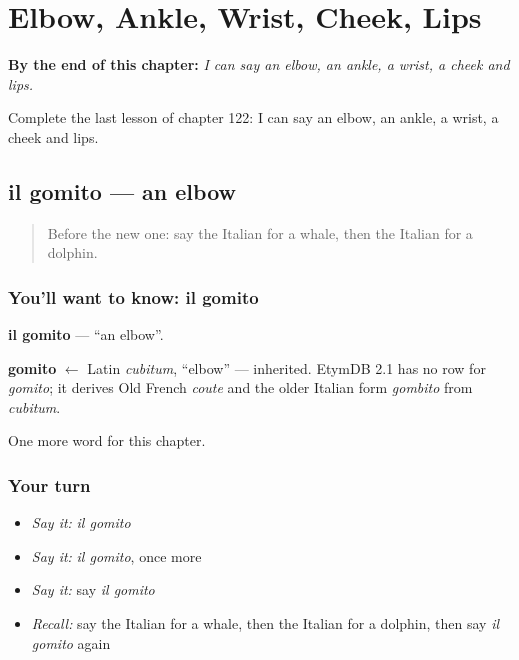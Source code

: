 
\chapter{Elbow, Ankle, Wrist, Cheek, Lips}
\label{ch:it-elbow-ankle-wrist-cheek-lips}

\begin{chapteropening}
\textbf{By the end of this chapter:} \emph{I can say an elbow, an ankle, a wrist, a cheek and lips.}

Complete the last lesson of chapter 122: I can say an elbow, an ankle, a wrist, a cheek and lips.
\end{chapteropening}

\section[il gomito]{il gomito — an elbow}

\label{lesson:IT-C122-gomito}



\begin{quote}
Before the new one: say the Italian for a whale, then the Italian for a dolphin.
\end{quote}

\subsection*{You'll want to know: il gomito}
\textbf{il gomito} — \textquotedblleft{}an elbow\textquotedblright{}.

\begin{cousinweb}
\textbf{gomito} $\leftarrow$ Latin \emph{cubitum}, \textquotedblleft{}elbow\textquotedblright{} — inherited. EtymDB 2.1 has no row for \emph{gomito}; it derives Old French \emph{coute} and the older Italian form \emph{gombito} from \emph{cubitum}.
\end{cousinweb}

\begin{grammarlens}[title={What you've built}]
One more word for this chapter.
\end{grammarlens}

\subsection*{Your turn}
\begin{itemize}
\raggedright
  \item \emph{Say it:} \emph{il gomito}
  \item \emph{Say it:} \emph{il gomito}, once more
  \item \emph{Say it:} say \emph{il gomito}
  \item \emph{Recall:} say the Italian for a whale, then the Italian for a dolphin, then say \emph{il gomito} again
\end{itemize}

